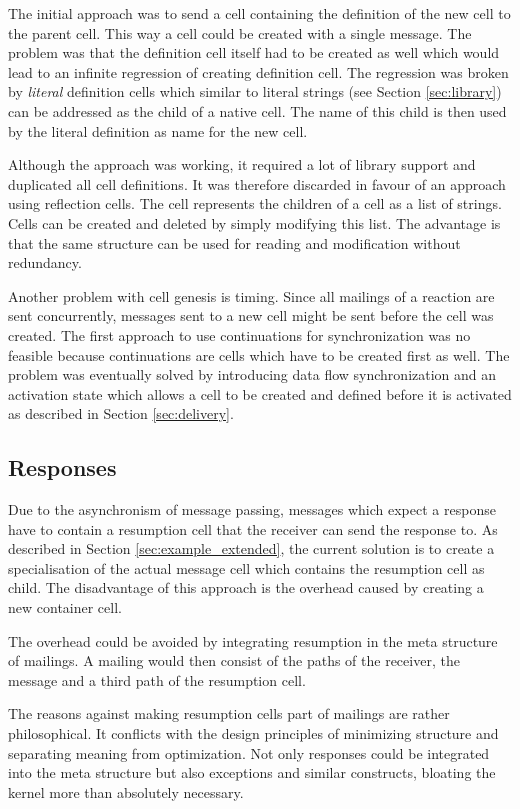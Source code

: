 The initial approach was to send a cell containing the definition of the new cell to the parent cell. This way a cell could be created with a single message. The problem was that the definition cell itself had to be created as well which would lead to an infinite regression of creating definition cell. The regression was broken by \textit{literal} definition cells which similar to literal strings (see Section \ref{sec:library}) can be addressed as the child of a native cell. The name of this child is then used by the literal definition as name for the new cell.

Although the approach was working, it required a lot of library support and duplicated all cell definitions. It was therefore discarded in favour of an approach using reflection cells. The cell  represents the children of a cell as a list of strings. Cells can be created and deleted by simply modifying this list. The advantage is that the same structure can be used for reading and modification without redundancy.

Another problem with cell genesis is timing. Since all mailings of a reaction are sent concurrently, messages sent to a new cell might be sent before the cell was created. The first approach to use continuations for synchronization was no feasible because continuations are cells which have to be created first as well. The problem was eventually solved by introducing data flow synchronization and an activation state which allows a cell to be created and defined before it is activated as described in Section \ref{sec:delivery}. 

\subsection{Responses}

Due to the asynchronism of message passing, messages which expect a response have to contain a resumption cell that the receiver can send the response to. As described in Section \ref{sec:example_extended}, the current solution is to create a specialisation of the actual message cell which contains the resumption cell as child. The disadvantage of this approach is the overhead caused by creating a new container cell.

The overhead could be avoided by integrating resumption in the meta structure of mailings. A mailing would then consist of the paths of the receiver, the message and a third path of the resumption cell.

The reasons against making resumption cells part of mailings are rather philosophical. It conflicts with the design principles of minimizing structure and separating meaning from optimization. Not only responses could be integrated into the meta structure but also exceptions and similar constructs, bloating the kernel more than absolutely necessary.

